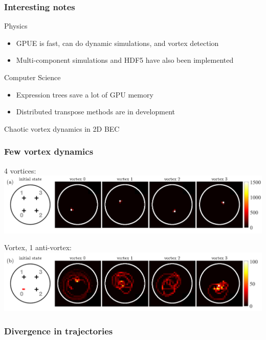 \documentclass{beamer}
\begin{document}
\begin{frame}
\frametitle{Interesting notes}

Physics
\begin{itemize}
\item GPUE is fast, can do dynamic simulations, and vortex detection
\item Multi-component simulations and HDF5 have also been implemented
\end{itemize}

Computer Science
\begin{itemize}
\item Expression trees save a lot of GPU memory
\item Distributed transpose methods are in development
\end{itemize}
\end{frame}

\begin{frame}
\center \huge Chaotic vortex dynamics in 2D BEC
\end{frame}

\begin{frame}
\frametitle{Few vortex dynamics}

4 vortices:
\includegraphics[width=\textwidth]{histogram_1}

 Vortex, 1 anti-vortex:
\includegraphics[width=\textwidth]{histogram_2}


\end{frame}

\begin{frame}
\frametitle{Divergence in trajectories}

\end{frame}
\end{document}
